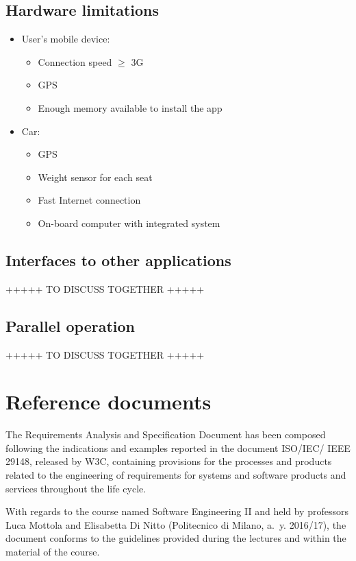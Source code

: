 \subsection{Hardware limitations}
\begin{itemize}
	\item User's mobile device:
\begin{itemize}
	\item Connection speed \(\geqslant\) 3G
	\item GPS
	\item Enough memory available to install the app
\end{itemize}
	\item Car:
	\begin{itemize}
	\item GPS
	\item Weight sensor for each seat
	\item Fast Internet connection
	\item On-board computer with integrated system
\end{itemize}
\end{itemize}

\subsection{Interfaces to other applications}
+++++ TO DISCUSS TOGETHER +++++

\subsection{Parallel operation}
+++++ TO DISCUSS TOGETHER +++++

\section{Reference documents}
The Requirements Analysis and Specification Document has been composed following the indications and examples reported in the document ISO/IEC/ IEEE 29148, released by W3C, containing provisions for the processes and products related to the engineering of requirements for systems and software products and services throughout the life cycle.

With regards to the course named Software Engineering II and held by professors Luca Mottola and Elisabetta Di Nitto (Politecnico di Milano, a.~y. 2016/17), the document conforms to the guidelines provided during the lectures and within the material of the course.